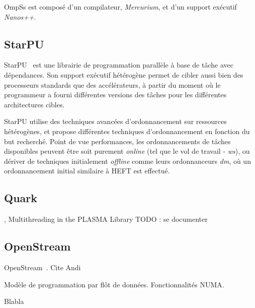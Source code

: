 OmpSs est composé d'un compilateur, \emph{Mercurium}, et d'un support exécutif \emph{Nanos++}.

\subsection{StarPU}

StarPU~\cite{StarPU} est une librairie de programmation parallèle à base de tâche avec dépendances.
Son support exécutif hétérogène permet de cibler aussi bien des processeurs standards que des accélérateurs, à partir du moment où le programmeur a fourni différentes versions des tâches pour les différentes architectures cibles.

StarPU utilise des techniques avancées d'ordonnancement sur ressources hétérogènes, et propose différentes techniques d'ordonnancement en fonction du but recherché.
Point de vue performances, les ordonnancements de tâches disponibles peuvent être soit purement \emph{online} (tel que le vol de travail - \emph{ws}), ou dériver de techniques initialement \emph{offline} comme leurs ordonnanceurs \emph{dm}, où un ordonnancement initial similaire à HEFT est effectué.

\subsection{Quark}

\cite{Kurzak2013}, Multithreading in the PLASMA Library
TODO : se documenter

\subsection{OpenStream}

OpenStream~\cite{Pop2013}.
Cite Andi

Modèle de programmation par flôt de données.
Fonctionnalités NUMA.


Blabla
